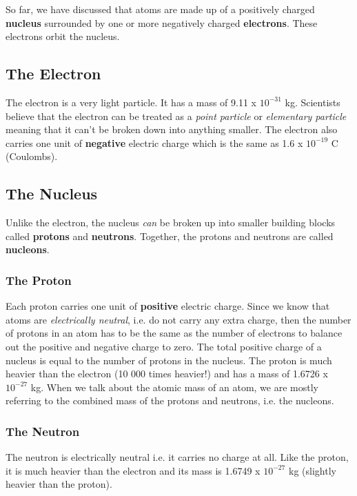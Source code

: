 So far, we have discussed that atoms are made up of a positively charged \textbf{nucleus} surrounded by
one or more negatively charged \textbf{electrons}. These electrons orbit the nucleus.

\subsection{The Electron}
The electron is a very light particle. It has a mass of 9.11 x $10^{-31}$ kg. 
Scientists believe that the electron can be treated as a \emph{point particle}
or \emph{elementary particle}
meaning that it can't be broken down into anything smaller. The electron also carries one unit
of \textbf{negative} electric charge which is the same as 1.6 x $10^{-19}$ C (Coulombs).

\subsection{The Nucleus}
Unlike the electron, the nucleus \emph{can} be broken up into smaller building
blocks called \textbf{protons} and \textbf{neutrons}. Together, the protons and 
neutrons are called \textbf{nucleons}.

\subsubsection{The Proton}
Each proton carries one unit of \textbf{positive} electric charge. 
Since we know that atoms are
\emph{electrically neutral}, i.e. do not carry any extra charge, then the number
of protons in an atom has to be the same as the number of electrons to balance
out the positive and negative charge to zero. The total positive charge of a 
nucleus is equal to the number of protons in the nucleus. The proton is much heavier 
than the electron (10 000 times heavier!) and has a mass of 1.6726 x $10^{-27}$ kg. When we talk about the atomic mass of an atom, we are mostly referring to the combined mass of the protons and neutrons, i.e. the nucleons.


\subsubsection{The Neutron}
The neutron is electrically neutral i.e. it carries no charge at all. 
Like the proton, it is much heavier than the electron and its mass is 1.6749 
x $10^{-27}$ kg (slightly heavier than the proton).


